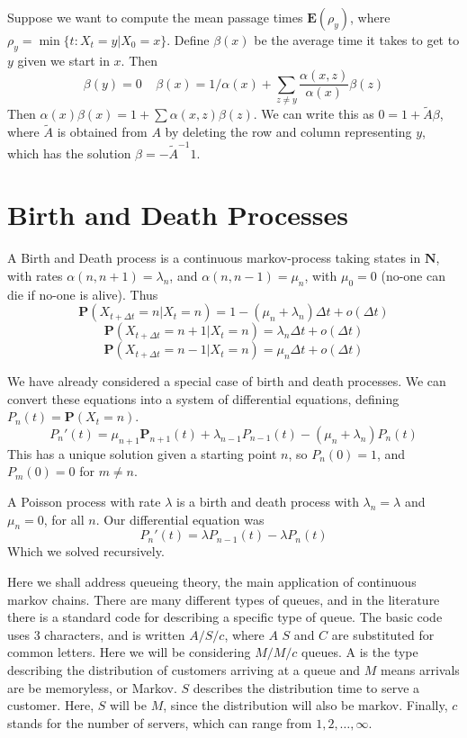 Suppose we want to compute the mean passage times $\mathbf{E}(\rho_y)$, where $\rho_y = \min \{ t : X_t = y | X_0 = x \}$. Define $\beta(x)$ be the average time it takes to get to $y$ given we start in $x$. Then
%
\[ \beta(y) = 0\ \ \ \ \ \beta(x) = 1/\alpha(x) + \sum_{z \neq y} \frac{\alpha(x,z)}{\alpha(x)} \beta(z) \]
%
Then $\alpha(x) \beta(x) = 1 + \sum \alpha(x,z) \beta(z)$. We can write this as $0 = 1 + \tilde{A} \beta$, where $\tilde{A}$ is obtained from $A$ by deleting the row and column representing $y$, which has the solution $\beta = -\tilde{A}^{-1} 1$.

\section{Birth and Death Processes}

\begin{definition}
    A Birth and Death process is a continuous markov-process taking states in $\mathbf{N}$, with rates $\alpha(n,n+1) = \lambda_n$, and $\alpha(n,n-1) = \mu_n$, with $\mu_0 = 0$ (no-one can die if no-one is alive). Thus
    \[ \mathbf{P}(X_{t + \Delta t} = n | X_t = n) = 1 - (\mu_n + \lambda_n) \Delta t + o(\Delta t) \]
    \[ \mathbf{P}(X_{t + \Delta t} = n + 1 | X_t = n) = \lambda_n \Delta t + o(\Delta t) \]
    \[ \mathbf{P}(X_{t + \Delta t} = n - 1 | X_t = n) = \mu_n \Delta t + o(\Delta t) \]
\end{definition}

We have already considered a special case of birth and death processes. We can convert these equations into a system of differential equations, defining $P_n(t) = \mathbf{P}(X_t = n)$.
%
\[ P_n'(t) = \mu_{n+1} \mathbf{P}_{n+1}(t) + \lambda_{n-1} P_{n-1}(t) - (\mu_n + \lambda_n) P_n(t) \]
%
This has a unique solution given a starting point $n$, so $P_n(0) = 1$, and $P_m(0) = 0$ for $m \neq n$.

\begin{example}
    A Poisson process with rate $\lambda$ is a birth and death process with $\lambda_n = \lambda$ and $\mu_n = 0$, for all $n$. Our differential equation was
    \[ P_n'(t) = \lambda P_{n-1}(t) - \lambda P_n(t)  \]
    Which we solved recursively.
\end{example}

Here we shall address queueing theory, the main application of continuous markov chains. There are many different types of queues, and in the literature there is a standard code for describing a specific type of queue. The basic code uses 3 characters, and is written $A/S/c$, where $A$ $S$ and $C$ are substituted for common letters. Here we will be considering $M/M/c$ queues. A is the type describing the distribution of customers arriving at a queue and $M$ means arrivals are be memoryless, or Markov. $S$ describes the distribution time to serve a customer. Here, $S$ will be $M$, since the distribution will also be markov. Finally, $c$ stands for the number of servers, which can range from $1,2, \dots, \infty$.

